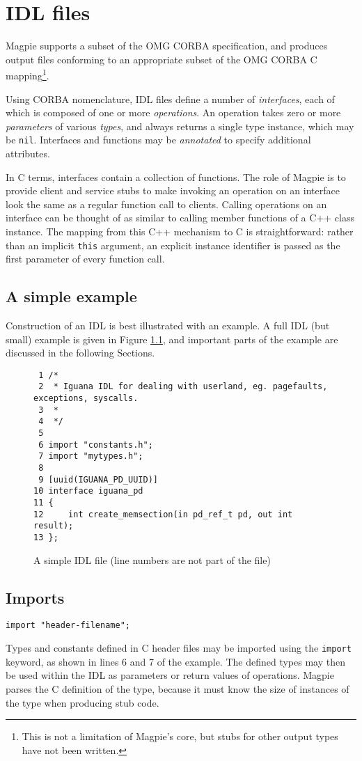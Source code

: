 \chapter{IDL files}

Magpie supports a subset of the OMG CORBA specification\cite{OMG:Corba}, and produces output files conforming to an appropriate subset of the OMG CORBA C mapping\footnote{This is not a limitation of Magpie's core, but stubs for other output types have not been written.}.

Using CORBA nomenclature, IDL files define a number of {\it interfaces}, each of which is composed of one or more {\it operations}. An operation takes zero or more {\it parameters} of various {\it types}, and always returns a single type instance, which may be {\tt nil}. Interfaces and functions may be {\it annotated} to specify additional attributes.

In C terms, interfaces contain a collection of functions. The role of Magpie is to provide client and service stubs to make invoking an operation on an interface look the same as a regular function call to clients. Calling operations on an interface can be thought of as similar to calling member functions of a C++ class instance. The mapping from this C++ mechanism to C is straightforward: rather than an implicit {\tt this} argument, an explicit instance identifier is passed as the first parameter of every function call.

\section{A simple example}
Construction of an IDL is best illustrated with an example. A full IDL (but small) example is given in Figure \ref{figure:writingidl:example}, and important parts of the example are discussed in the following Sections.

\begin{figure}
\begin{verbatim}
 1 /*
 2  * Iguana IDL for dealing with userland, eg. pagefaults, exceptions, syscalls.
 3  *
 4  */
 5
 6 import "constants.h";
 7 import "mytypes.h";
 8
 9 [uuid(IGUANA_PD_UUID)]
10 interface iguana_pd
11 {
12     int create_memsection(in pd_ref_t pd, out int result);
13 };
\end{verbatim}
\caption{A simple IDL file (line numbers are not part of the file)}
\label{figure:writingidl:example}
\end{figure}

\section{Imports}
\begin{verbatim}
import "header-filename";
\end{verbatim}
Types and constants defined in C header files may be imported using the {\tt import} keyword, as shown in lines 6 and 7 of the example. The defined types may then be used within the IDL as parameters or return values of operations. Magpie parses the C definition of the type, because it must know the size of instances of the type when producing stub code.

